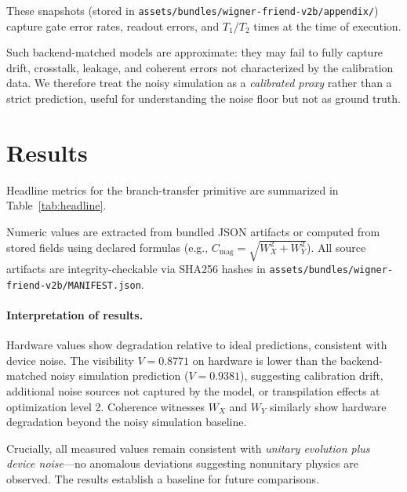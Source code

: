 \documentclass[11pt]{article}
\begin{document}
These snapshots (stored in \texttt{assets/bundles/wigner-friend-v2b/appendix/}) capture gate error rates, readout errors, and $T_1$/$T_2$ times at the time of execution.
\vspace{0.5em}

Such backend-matched models are approximate: they may fail to fully capture drift, crosstalk, leakage, and coherent errors not characterized by the calibration data. We therefore treat the noisy simulation as a \emph{calibrated proxy} rather than a strict prediction, useful for understanding the noise floor but not as ground truth.

\section{Results}

Headline metrics for the branch-transfer primitive are summarized in Table~\ref{tab:headline}.

\label{sec:results}

Numeric values are extracted from bundled JSON artifacts or computed from stored fields using declared formulas (e.g., $C_\mathrm{mag} = \sqrt{W_X^2 + W_Y^2}$). All source artifacts are integrity-checkable via SHA256 hashes in \texttt{assets/bundles/wigner-friend-v2b/MANIFEST.json}.



\paragraph{Interpretation of results.}
Hardware values show degradation relative to ideal predictions, consistent with device noise. The visibility $V = 0.8771$ on hardware is lower than the backend-matched noisy simulation prediction ($V = 0.9381$), suggesting calibration drift, additional noise sources not captured by the model, or transpilation effects at optimization level 2. Coherence witnesses $W_X$ and $W_Y$ similarly show hardware degradation beyond the noisy simulation baseline.

Crucially, all measured values remain consistent with \emph{unitary evolution plus device noise}---no anomalous deviations suggesting nonunitary physics are observed. The results establish a baseline for future comparisons.
\end{document}
